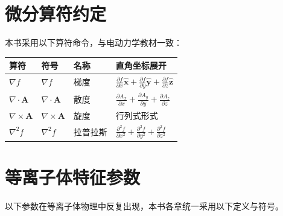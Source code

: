 \documentclass[12pt,a4paper,openany,oneside]{book}
\newcommand{\vect}[1]{\bm{#1}}
\newcommand{\unitvec}[1]{\hat{\vect{#1}}}
\newcommand{\grad}{\nabla}
\newcommand{\curl}{\nabla\times}
\newcommand{\divg}{\nabla\cdot}
\newcommand{\lap}{\nabla^2}
\begin{document}
\section*{微分算符约定}

本书采用以下算符命令，与电动力学教材一致：
\begin{table}[htbp]
\centering
\small
\begin{tabular}{@{}lllp{6.6cm}@{}}
\toprule
\textbf{算符} & \textbf{符号} & \textbf{名称} & \textbf{直角坐标展开} \\
\midrule
$\grad f$ & $\nabla f$ & 梯度 & $\frac{\partial f}{\partial x}\unitvec{x}+\frac{\partial f}{\partial y}\unitvec{y}+\frac{\partial f}{\partial z}\unitvec{z}$ \\
$\divg\vect{A}$ & $\nabla\cdot\vect{A}$ & 散度 & $\frac{\partial A_x}{\partial x}+\frac{\partial A_y}{\partial y}+\frac{\partial A_z}{\partial z}$ \\
$\curl\vect{A}$ & $\nabla\times\vect{A}$ & 旋度 & 行列式形式 \\
$\lap f$ & $\nabla^2 f$ & 拉普拉斯 & $\frac{\partial^2 f}{\partial x^2}+\frac{\partial^2 f}{\partial y^2}+\frac{\partial^2 f}{\partial z^2}$ \\
\bottomrule
\end{tabular}
\end{table}


\section*{等离子体特征参数}

以下参数在等离子体物理中反复出现，本书各章统一采用以下定义与符号。
\end{document}

